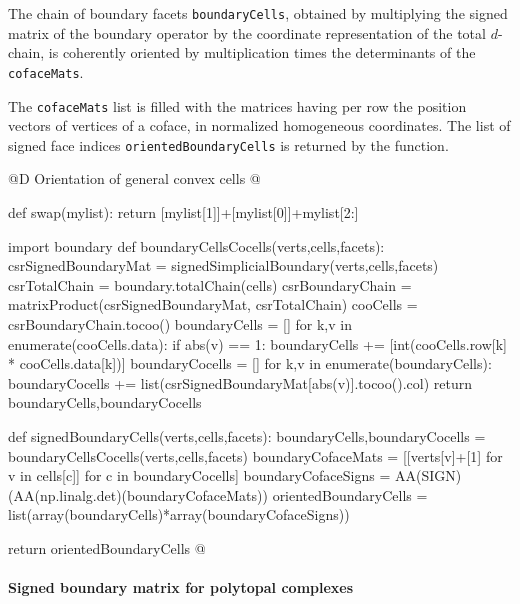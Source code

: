 \documentclass[11pt,oneside]{article}    %
\begin{document}
The chain of boundary facets \texttt{boundaryCells}, obtained by multiplying the signed matrix of the boundary operator by the coordinate representation of the total $d$-chain, is coherently oriented by multiplication times the determinants of the \texttt{cofaceMats}.

The \texttt{cofaceMats} list is filled 
with the matrices having per row the position vectors of vertices of a coface, in normalized 
homogeneous coordinates. The list of signed face indices \texttt{orientedBoundaryCells} is returned by the function.

@D Orientation of general convex cells
@{def swap(mylist): return [mylist[1]]+[mylist[0]]+mylist[2:]

import boundary
def boundaryCellsCocells(verts,cells,facets):
    csrSignedBoundaryMat = signedSimplicialBoundary(verts,cells,facets)
    csrTotalChain = boundary.totalChain(cells)
    csrBoundaryChain = matrixProduct(csrSignedBoundaryMat, csrTotalChain)
    cooCells = csrBoundaryChain.tocoo()    
    boundaryCells = []
    for k,v in enumerate(cooCells.data):
        if abs(v) == 1:
            boundaryCells += [int(cooCells.row[k] * cooCells.data[k])]            
    boundaryCocells = []
    for k,v in enumerate(boundaryCells):
        boundaryCocells += list(csrSignedBoundaryMat[abs(v)].tocoo().col)        
    return boundaryCells,boundaryCocells

def signedBoundaryCells(verts,cells,facets):
    boundaryCells,boundaryCocells = boundaryCellsCocells(verts,cells,facets)        
    boundaryCofaceMats = [[verts[v]+[1] for v in cells[c]] for c in boundaryCocells]
    boundaryCofaceSigns = AA(SIGN)(AA(np.linalg.det)(boundaryCofaceMats))
    orientedBoundaryCells = list(array(boundaryCells)*array(boundaryCofaceSigns))
    
    return orientedBoundaryCells
@}

\paragraph{Signed boundary matrix for polytopal complexes}
\end{document}
